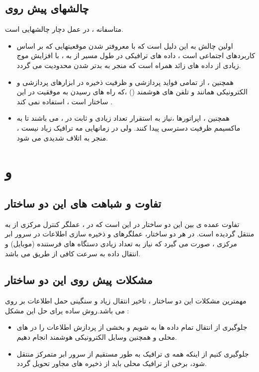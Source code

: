 \subsection{چالشهای پیش روی }
متاسفانه ،  در عمل دچار چالشهایی است.
\begin{itemize}
\item
 اولین چالش به این دلیل است که با معروفتر شدن موقعیتهایی که بر اساس کاربردهای اجتماعی است ، داده های ترافیکی در طول مسیر   از  به ، با افزایش موج زیادی از داده های زائد همراه است که منجر به بدتر شدن محدودیت  می گردد.
\item
همچنین  ، از تمامی فواید پردازشی و ظرفیت ذخیره در ابزارهای پردازشی و الکترونیکی همانند  و تلفن های هوشمند () ،که راه های رسیدن به موفقیت در این ساختار است ، استفاده نمی کند .
\item
همچنین ، اپراتورها ،نیاز به استقرار تعداد زیادی  و  ثابت در  ، می باشند تا به ماکسیمم ظرفیت دسترسی پیدا کنند. ولی در زمانهایی مه ترافیک زیاد نیست ، منجر به اتلاف شدیدی می شود. 
\end{itemize}
\section{و  }

\subsection{تفاوت و شباهت های این دو ساختار}
  تفاوت عمده ی بین این دو ساختار در این است که در  ، عملگر کنترل مرکزی از  به  منتقل گردیده است. \cite{fogComputing}
 \newline
در هر دو ساختار، عملگرهای   و ذخیره سازی اطلاعات در سرور ابر مرکزی ، صورت می گیرد که نیاز به تعداد زیادی دستگاه های فرستنده (موبایل) و انتقال داده به سرعت کافی از طریق  می باشد.
\subsection{مشکلات پیش روی این دو ساختار}
مهمترین مشکلات این دو ساختار ، تاخیر انتقال زیاد و سنگینی حمل اطلاعات بر روی  می باشد.روش ساده یرای حل این مشکل :
\begin{itemize}
\item
جلوگیری از انتقال تمام داده ها به  شویم و بخشی از پردازش اطلاعات را در  های محلی و همچنین وسایل الکترونیکی هوشمند انجام دهیم.
\item
جلوگیری کنیم از اینکه همه ی ترافیک به طور مستقیم از سرور ابر متمرکز منتقل شود، برخی از ترافیک محلی باید از ذخیره   های مجاور تحویل گردد.
\end{itemize}
